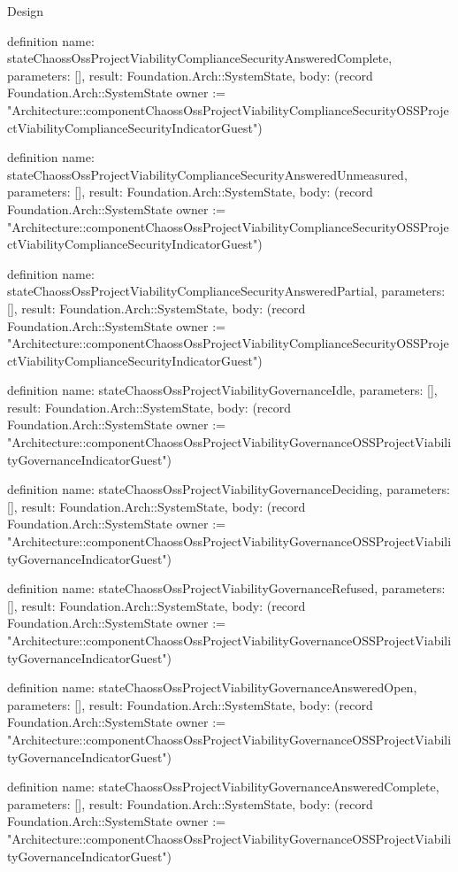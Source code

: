 \begin{lexlean}{Design}
\begin{semanticmodule}
definition{
  name: stateChaossOssProjectViabilityComplianceSecurityAnsweredComplete,
  parameters: [],
  result: Foundation.Arch::SystemState,
  body: (record Foundation.Arch::SystemState {owner := "Architecture::componentChaossOssProjectViabilityComplianceSecurityOSSProjectViabilityComplianceSecurityIndicatorGuest"})
}

definition{
  name: stateChaossOssProjectViabilityComplianceSecurityAnsweredUnmeasured,
  parameters: [],
  result: Foundation.Arch::SystemState,
  body: (record Foundation.Arch::SystemState {owner := "Architecture::componentChaossOssProjectViabilityComplianceSecurityOSSProjectViabilityComplianceSecurityIndicatorGuest"})
}

definition{
  name: stateChaossOssProjectViabilityComplianceSecurityAnsweredPartial,
  parameters: [],
  result: Foundation.Arch::SystemState,
  body: (record Foundation.Arch::SystemState {owner := "Architecture::componentChaossOssProjectViabilityComplianceSecurityOSSProjectViabilityComplianceSecurityIndicatorGuest"})
}

definition{
  name: stateChaossOssProjectViabilityGovernanceIdle,
  parameters: [],
  result: Foundation.Arch::SystemState,
  body: (record Foundation.Arch::SystemState {owner := "Architecture::componentChaossOssProjectViabilityGovernanceOSSProjectViabilityGovernanceIndicatorGuest"})
}

definition{
  name: stateChaossOssProjectViabilityGovernanceDeciding,
  parameters: [],
  result: Foundation.Arch::SystemState,
  body: (record Foundation.Arch::SystemState {owner := "Architecture::componentChaossOssProjectViabilityGovernanceOSSProjectViabilityGovernanceIndicatorGuest"})
}

definition{
  name: stateChaossOssProjectViabilityGovernanceRefused,
  parameters: [],
  result: Foundation.Arch::SystemState,
  body: (record Foundation.Arch::SystemState {owner := "Architecture::componentChaossOssProjectViabilityGovernanceOSSProjectViabilityGovernanceIndicatorGuest"})
}

definition{
  name: stateChaossOssProjectViabilityGovernanceAnsweredOpen,
  parameters: [],
  result: Foundation.Arch::SystemState,
  body: (record Foundation.Arch::SystemState {owner := "Architecture::componentChaossOssProjectViabilityGovernanceOSSProjectViabilityGovernanceIndicatorGuest"})
}

definition{
  name: stateChaossOssProjectViabilityGovernanceAnsweredComplete,
  parameters: [],
  result: Foundation.Arch::SystemState,
  body: (record Foundation.Arch::SystemState {owner := "Architecture::componentChaossOssProjectViabilityGovernanceOSSProjectViabilityGovernanceIndicatorGuest"})
}


\end{semanticmodule}
\end{lexlean}
